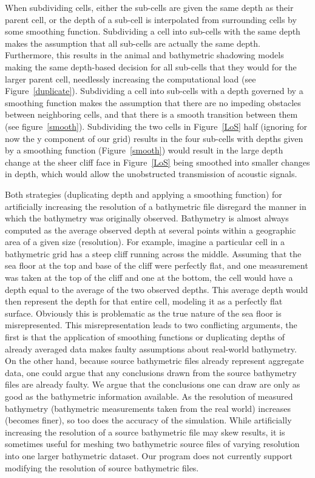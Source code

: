  
When subdividing cells, either the sub-cells are given the same depth as their parent cell, or the depth of a sub-cell is interpolated from surrounding cells by some smoothing function.  Subdividing a cell into sub-cells with the same depth makes the assumption that all sub-cells are actually the same depth.  Furthermore, this results in the animal and bathymetric shadowing models making the same depth-based decision for all sub-cells that they would for the larger parent cell, needlessly increasing the computational load (see Figure~\ref{duplicate}).  Subdividing a cell into sub-cells with a depth governed by a smoothing function makes the assumption that there are no impeding obstacles between neighboring cells, and that there is a smooth transition between them (see figure~\ref{smooth}).  Subdividing the two cells in Figure~\ref{LoS} half (ignoring for now the y component of our grid) results in the four sub-cells with depths given by a smoothing function (Figure~\ref{smooth}) would result in the large depth change at the sheer cliff face in Figure~\ref{LoS} being smoothed into smaller changes in depth, which would allow the unobstructed transmission of acoustic signals.


Both strategies (duplicating depth and applying a smoothing function) for artificially increasing the resolution of a bathymetric file disregard the manner in which the bathymetry was originally observed.  Bathymetry is almost always computed as the average observed depth at several points within a geographic area of a given size (resolution).  For example, imagine a particular cell in a bathymetric grid has a steep cliff running across the middle.  Assuming that the sea floor at the top and base of the cliff were perfectly flat, and one measurement was taken at the top of the cliff and one at the bottom, the cell would have a depth equal to the average of the two observed depths.  This average depth would then represent the depth for that entire cell, modeling it as a perfectly flat surface.  Obviously this is problematic as the true nature of the sea floor is misrepresented.  This misrepresentation leads to two conflicting arguments, the first is that the application of smoothing functions or duplicating depths of already averaged data makes faulty assumptions about real-world bathymetry.  On the other hand, because source bathymetric files already represent aggregate data, one could argue that any conclusions drawn from the source bathymetry files are already faulty.  We argue that the conclusions one can draw are only as good as the bathymetric information available.  As the resolution of measured bathymetry (bathymetric measurements taken from the real world) increases (becomes finer), so too does the accuracy of the simulation.  While artificially increasing the resolution of a source bathymetric file may skew results, it is sometimes useful for meshing two bathymetric source files of varying resolution into one larger bathymetric dataset.  Our program does not currently support modifying the resolution of source bathymetric files.

